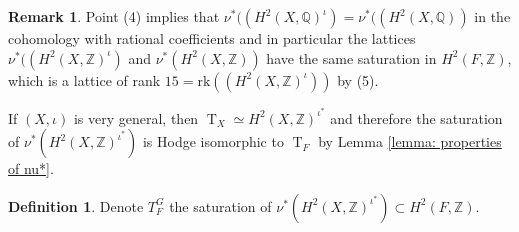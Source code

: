 \documentclass{amsart}
\theoremstyle{definition}
\newtheorem{defi}[thm]{Definition}
\newtheorem{rem}[thm]{Remark}
\numberwithin{equation}{section}
\numberwithin{equation}{section} \theoremstyle{definition}
\DeclareMathOperator{\T}{T}
\newcommand\Q{\mathbb Q}
\newcommand\Z{\mathbb{Z}}
\newcommand\rk{\mathrm{rk}}
\begin{document}
\begin{rem}{\rm Point (4) implies that $\nu^*((H^2(X,\Q)^{\iota})=\nu^*((H^2(X,\Q))$ in the cohomology with rational coefficients and in particular the lattices $\nu^*((H^2(X,\Z)^{\iota})$ and $\nu^*(H^2(X,\Z))$ have the same saturation in $H^2(F,\Z)$, which is a lattice of rank $15=\rk((H^2(X,\Z)^{\iota}))$ by (5).}
\end{rem}


If $(X,\iota)$ is very general, then $\T_X\simeq H^2(X,\Z)^{\iota^*}$ and therefore the saturation of $\nu^*\left(H^2(X,\mathbb Z)^{\iota^*}\right)$ is Hodge isomorphic to $\T_F$ by Lemma \ref{lemma: properties of nu*}. 
\begin{defi}
Denote $T_F^{G}$
the saturation of $\nu^*(H^2(X,\mathbb Z)^{\iota^*})\subset H^2(F,\mathbb{Z})$. 
\end{defi}
\end{document}
